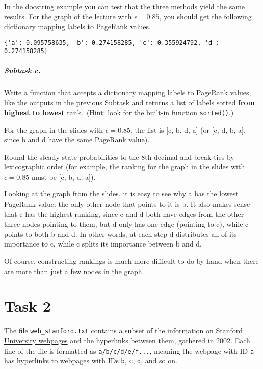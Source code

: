 \documentclass[a4paper,10pt]{article}
\begin{document}
In the docstring example you can test that the three methods yield the
same results. For the graph of the lecture with \(\epsilon=0.85\), you
should get the following dictionary mapping labels to PageRank values.

\begin{lstlisting}
{'a': 0.095758635, 'b': 0.274158285, 'c': 0.355924792, 'd': 0.274158285}
\end{lstlisting}

\subparagraph{Subtask c.}\label{subtask-c.}

Write a function that accepts a dictionary mapping labels to PageRank
values, like the outputs in the previous Subtask and returns a list of
labels sorted \textbf{from highest to lowest} rank.~(Hint: look for the
built-in function \texttt{sorted()}.)

For the graph in the slides with \(\epsilon=0.85\), the list is \([\)c,
b, d, a\(]\) (or \([\)c, d, b, a\(]\), since b and d have the same
PageRank value).

\color{red}
\marginnote{---}Round the steady state probabilities to the 8th decimal
and break ties by lexicographic order (for example, the ranking for the
graph in the slides with \(\epsilon=0.85\) must be \([\)c, b, d, a\(]\)).
\color{black}

Looking at the graph from the slides, it is easy to see why a has the
lowest PageRank value: the only other node that points to it is b. It
also makes sense that c has the highest ranking, since c and d both have
edges from the other three nodes pointing to them, but d only has one
edge (pointing to c), while c points to both b and d. In other words, at
each step d distributes all of its importance to c, while c splits its
importance between b and d.

Of course, constructing rankings is much more difficult to do by hand
when there are more than just a few nodes in the graph.

\section*{Task 2}

The file \texttt{web\_stanford.txt} contains a subset of the information
on \href{http://snap.stanford.edu/data/web-Stanford.html}{Stanford
University webpages} and the hyperlinks between them, gathered in 2002.
Each line of the file is formatted as \texttt{a/b/c/d/e/f...}, meaning
the webpage with ID \texttt{a} has hyperlinks to webpages with IDs
\texttt{b}, \texttt{c}, \texttt{d}, and so on.
\end{document}
